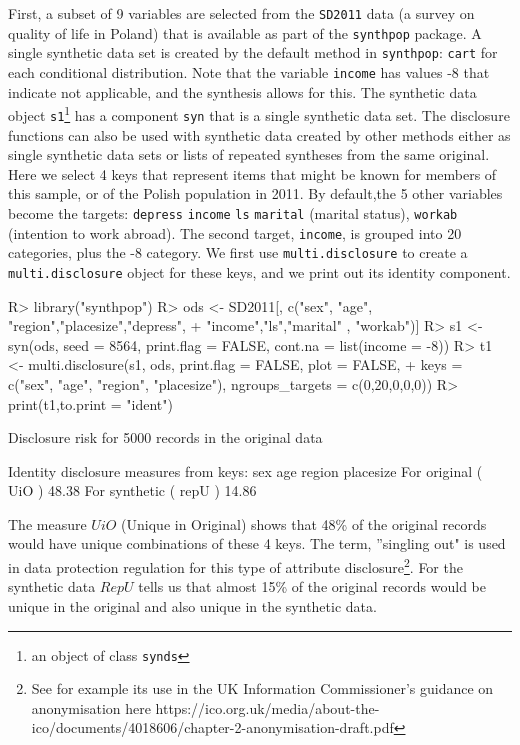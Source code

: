 \documentclass[12pt]{article}
\renewcommand{\baselinestretch}{1.5} %
\begin{document}
First, a subset of 9 variables are selected from the \texttt{SD2011} data (a survey on quality of life in Poland) that is available as part of the \texttt{synthpop} package. A single synthetic data set is created by the default method in \texttt{synthpop}: \texttt{cart} for each conditional distribution. Note that the variable \texttt{income} has values -8 that indicate not applicable, and the synthesis allows for this. The synthetic data object \texttt{s1}\footnote{an object of class \texttt{synds}} has a component \texttt{syn} that is a single synthetic data set. The disclosure functions can also be used with synthetic data created by other methods either as single synthetic data sets or lists of repeated syntheses from the same original. Here we select 4 keys that represent items that might be known
for members of this sample, or of the Polish population in 2011. By default,the 5 other variables become the targets: \texttt{depress} \texttt{income} \texttt{ls} \texttt{marital} (marital status), \texttt{workab} (intention to work abroad). The second target, \texttt{income}, is grouped into 20 categories, plus the -8 category. 
We first use \texttt{multi.disclosure} to create a \texttt{multi.disclosure} object for these keys, and we print out its identity component.
\renewcommand{\baselinestretch}{1.0}
\begin{Schunk}
\begin{Sinput}
R> library("synthpop")
R> ods <- SD2011[, c("sex", "age", "region","placesize","depress",
+    "income","ls","marital" , "workab")]
R> s1 <- syn(ods, seed = 8564, print.flag = FALSE, cont.na = list(income = -8))
R> t1 <- multi.disclosure(s1, ods, print.flag = FALSE, plot = FALSE, 
+  keys = c("sex", "age", "region", "placesize"),   ngroups_targets = c(0,20,0,0,0))
R> print(t1,to.print = "ident")
\end{Sinput}
\begin{Soutput}
Disclosure risk for 5000 records in the original data

Identity disclosure measures
from keys: sex age region placesize 
For original  ( UiO )  48.38 %
For synthetic ( repU ) 14.86 %
\end{Soutput}
\end{Schunk}
\renewcommand{\baselinestretch}{1.5}
The measure $UiO$ (Unique in Original) shows that 48\% of the original records would have unique combinations of these 4 keys. The term, ''singling out" is used in data protection regulation for this type of attribute disclosure\footnote{See for example its use in the UK Information Commissioner's guidance on anonymisation here https://ico.org.uk/media/about-the-ico/documents/4018606/chapter-2-anonymisation-draft.pdf}. For the synthetic data $RepU$ tells us that almost 15\% of the original records would be unique in the original and also unique in the synthetic data.
\end{document}
